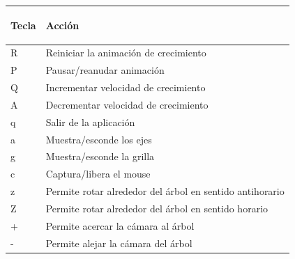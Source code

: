 \documentclass[11pt]{article}
\begin{document}
    \begin{tabular}{|| l | l ||}
      \hline
      \begin{large}Tecla\end{large} & 
	\begin{large}Acci\'{o}n \end{large} \\
          \hline
R & Reiniciar la animaci\'on de crecimiento \\
P & Pausar/reanudar animaci\'on  \\
Q & Incrementar velocidad de crecimiento  \\
A & Decrementar velocidad de crecimiento  \\
q & Salir de la aplicaci\'on  \\
a & Muestra/esconde los ejes  \\
g & Muestra/esconde la grilla  \\
c & Captura/libera el mouse  \\
z & Permite rotar alrededor del \'arbol en sentido antihorario  \\
Z & Permite rotar alrededor del \'arbol en sentido horario  \\
+ & Permite acercar la c\'amara al \'arbol  \\
- & Permite alejar la c\'amara del \'arbol  \\

          \hline
    \end{tabular}
\end{document}
